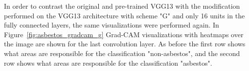 \begin{figure}[!h]
{}
\label{fig:vgg13_filter_activation}
\end{figure}

In order to contrast the original and pre-trained VGG13 with the modification performed on the VGG13 architecture with scheme "G" and only 16 units in the fully connected layers, the same visualizations were performed again. In Figure~\ref{fig:asbestos_gradcam_g} Grad-CAM visualizations with heatmaps over the image are shown for the last convolution layer. As before the first row shows what areas are responsible for the classification "non-asbestos", and the second row shows what areas are responsible for the classification "asbestos".

